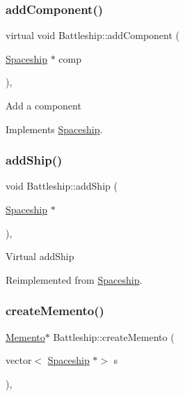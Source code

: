 \subsubsection{\texorpdfstring{add\+Component()}{addComponent()}}
{\footnotesize\ttfamily virtual void Battleship\+::add\+Component (\begin{DoxyParamCaption}\item[{\hyperlink{classSpaceship}{Spaceship} $\ast$}]{comp }\end{DoxyParamCaption})\hspace{0.3cm}{\ttfamily [inline]}, {\ttfamily [virtual]}}

Add a component 

Implements \hyperlink{classSpaceship_ac1b4673a691cd100708ddea08cd9f192}{Spaceship}.

\mbox{\label{classBattleship_a9167350d564a8f8286841408f0bacdf9}} 
\subsubsection{\texorpdfstring{add\+Ship()}{addShip()}}
{\footnotesize\ttfamily void Battleship\+::add\+Ship (\begin{DoxyParamCaption}\item[{\hyperlink{classSpaceship}{Spaceship} $\ast$}]{ }\end{DoxyParamCaption})\hspace{0.3cm}{\ttfamily [inline]}, {\ttfamily [virtual]}}

Virtual add\+Ship 

Reimplemented from \hyperlink{classSpaceship_a90e1321cdbcb459b98b75ab39cef867d}{Spaceship}.

\mbox{\label{classBattleship_a0e039fa419a67ff2fec0e65d93f2fefd}} 
\subsubsection{\texorpdfstring{create\+Memento()}{createMemento()}}
{\footnotesize\ttfamily \hyperlink{classMemento}{Memento}$\ast$ Battleship\+::create\+Memento (\begin{DoxyParamCaption}\item[{vector$<$ \hyperlink{classSpaceship}{Spaceship} $\ast$$>$}]{s }\end{DoxyParamCaption})\hspace{0.3cm}{\ttfamily [inline]}, {\ttfamily [virtual]}}

